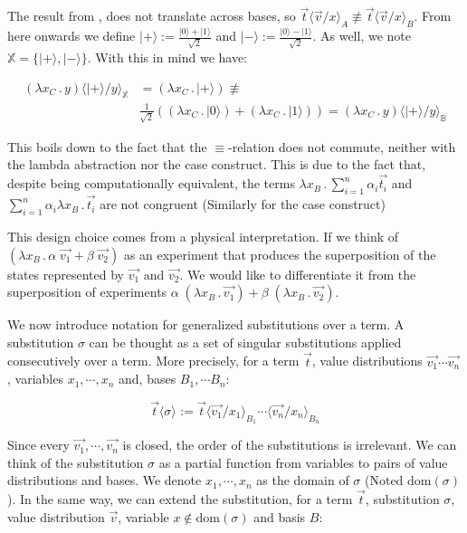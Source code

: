 \documentclass[runningheads,orivec]{llncs}
\newcommand\ket[1]{\ensuremath{|#1\rangle}}
\newcommand\ansubst[2]{\ensuremath{\langle #1 \rangle_{#2}}}
\newcommand\dom[1]{\mathrm{dom}(#1)}
\def\Lam#1#2#3{\lambda#1_{#2}\,{.}\,#3} %
\newcommand\B{\mathbb B}
\newcommand\XB{\mathbb X}
\begin{document}
\begin{remark}
  The result from , does not translate across bases, so $\vec{t}\ansubst{\vec{v}/x}{A} \not\equiv \vec{t}\ansubst{\vec{v}/x}{B}$. From here onwards we define $\ket{+}:=\frac{\ket{0}+\ket{1}}{\sqrt{2}}$ and $\ket{-}:=\frac{\ket{0}-\ket{1}}{\sqrt{2}}$. As well, we note $\XB = \{\ket{+}, \ket{-}\}$. With this in mind we have:
  
  \begin{align*}
    (\Lam{x}{C}{y})\ansubst{\ket{+}/y}{\XB} &= (\Lam{x}{C}{\ket{+}}) 
    \not\equiv \\ 
    &\frac{1}{\sqrt{2}} ((\Lam{x}{C}{\ket{0}}) + (\Lam{x}{C}{\ket{1}}))
    = (\Lam{x}{C}{y})\ansubst{\ket{+}/y}{\B}
  \end{align*}
  
  This boils down to the fact that the $\equiv$-relation does not commute, neither with the lambda abstraction nor the case construct. This is due to the fact that, despite being computationally equivalent, the terms $\Lam{x}{B}{\sum_{i=1}^{n}\alpha_i \vec{t_i}}$ and $\sum_{i=1}^{n}\alpha_i \Lam{x}{B}{\vec{t_i}}$ are not congruent (Similarly for the case construct)

  This design choice comes from a physical interpretation. If we think of $(\Lam{x}{B}{\alpha\;\vec{v_1} + \beta\;\vec{v_2}})$ as an experiment that produces the superposition of the states represented by $\vec{v_1}$ and $\vec{v_2}$. We would like to differentiate it from the superposition of experiments $\alpha\;(\Lam{x}{B}{\vec{v_1}}) + \beta\;(\Lam{x}{B}{\vec{v_2}})$.
\end{remark}

We now introduce notation for generalized substitutions over a term. A substitution $\sigma$ can be thought as a set of singular substitutions applied consecutively over a term. More precisely, for a term $\vec{t}$, value distributions $\vec{v_1}\dotsb\vec{v_n}$, variables $x_1,\dotsb ,x_n$ and, bases $B_1,\dotsb B_n$:

\[
  \vec{t}\ansubst{\sigma}{} := \vec{t}\ansubst{\vec{v_1}/x_1}{B_1}\dotsb\ansubst{\vec{v_n}/x_n}{B_n}
\]

Since every $\vec{v_1},\dotsb ,\vec{v_n}$ is closed, the order of the substitutions is irrelevant. We can think of the substitution $\sigma$ as a partial function from variables to pairs of value distributions and bases. We denote $x_1,\dotsb, x_n$ as the domain of $\sigma$ (Noted $\dom{\sigma}$). In the same way, we can extend the substitution, for a term $\vec{t}$, substitution $\sigma$, value distribution $\vec{v}$, variable $x\not\in\dom{\sigma}$ and basis $B$:
\end{document}
